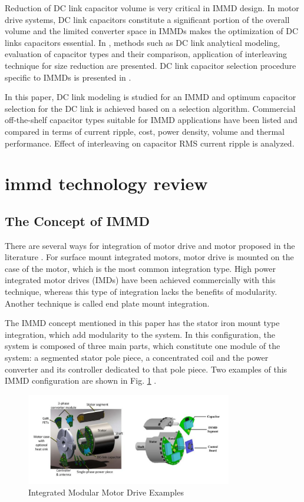 \documentclass[conference,a4paper,twocolumn]{IEEEtran}
\begin{document}
Reduction of DC link capacitor volume is very critical in IMMD design. In motor drive systems, DC link capacitors constitute a significant portion of the overall volume and the limited converter space in IMMDs makes the optimization of DC links capacitors essential. In \cite{Su2010,Bianchi2003,Zhang2010}, methods such as DC link analytical modeling, evaluation of capacitor types and their comparison, application of interleaving technique for size reduction are presented. DC link capacitor selection procedure specific to IMMDs is presented in \cite{LoCalzo2016,Wang2014,Wang2015}.

In this paper, DC link modeling is studied for an IMMD and optimum capacitor selection for the DC link is achieved based on a selection algorithm. Commercial off-the-shelf capacitor types suitable for IMMD applications have been listed and compared in terms of current ripple, cost, power density, volume and thermal performance. Effect of interleaving on capacitor RMS current ripple is analyzed.



\section{immd technology review}

\subsection{The Concept of IMMD}

There are several ways for integration of motor drive and motor proposed in the literature \cite{LoCalzo2016,Wolmarans2008}. For surface mount integrated motors, motor drive is mounted on the case of the motor, which is the most common integration type. High power integrated motor drives (IMDs) have been achieved commercially with this technique, whereas this type of integration lacks the benefits of modularity. Another technique is called end plate mount integration.

The IMMD concept mentioned in this paper has the stator iron mount type integration, which add modularity to the system. In this configuration, the system is composed of three main parts, which constitute one module of the system: a segmented stator pole piece, a concentrated coil and the power converter and its controller dedicated to that pole piece. Two examples of this IMMD configuration are shown in Fig. \ref{fig1} \cite{LoCalzo2016,Wang2015}.


\begin{figure}[h]
  \centering
  \includegraphics[width=9cm]{fig1}
  \caption{Integrated Modular Motor Drive Examples \cite{LoCalzo2016,Wang2015}}
  \label{fig1}
\end{figure}
\end{document}
